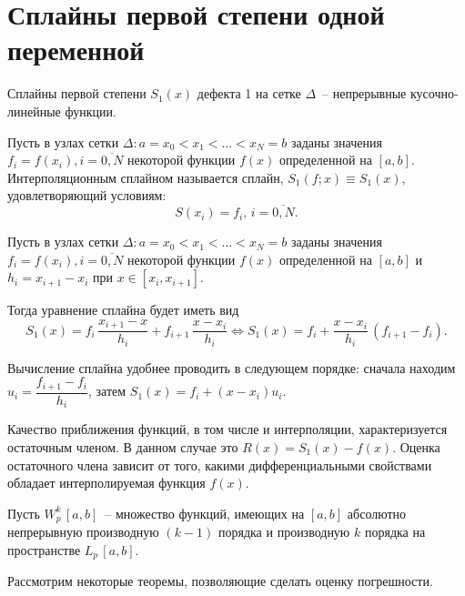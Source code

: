 ﻿\documentclass[a4paper,14pt]{extreport}
\begin{document}
\chapter{Сплайны первой степени одной переменной}
    Сплайны первой степени $S_1(x)$ дефекта 1 на сетке $\Delta$~-- непрерывные кусочно-линейные функции. 
    \begin{definition}
        Пусть в узлах сетки $\Delta:a=x_0<x_1<\ldots<x_N=b$ заданы значения $f_i=f(x_i), i=\overline{0, N}$ некоторой функции $f(x)$ определенной на $[a,b]$. Интерполяционным сплайном называется сплайн,  $S_{1}(f;x)\equiv S_{1}(x)$, удовлетворяющий условиям:
        \begin{equation}
            \label{ch_1.1}
            S(x_i)=f_i,\,i=\overline{0, N}.
        \end{equation}
    \end{definition}
    \begin{definition}
        Пусть в узлах сетки $\Delta:a=x_0<x_1<\ldots<x_N=b$ заданы значения $f_i=f(x_i), i=\overline{0, N}$ некоторой функции $f(x)$ определенной на $[a,b]$ и $h_i=x_{i+1}-x_i$ при  $x\in[x_i,x_{i+1}]$. \par Тогда уравнение сплайна будет иметь вид
        \begin{equation}
            \label{ch_1.2}
            S_1(x) = f_i\,\dfrac{x_{i+1}-x}{h_i}+f_{i+1}\,\dfrac{x-x_{i}}{h_i}\Leftrightarrow S_1(x) = f_i+\dfrac{x-x_{i}}{h_i}\,(f_{i+1}-f_i).
        \end{equation}
    \end{definition}
    Вычисление сплайна удобнее проводить в следующем порядке: сначала находим $u_{i}=\dfrac{f_{i+1}-f_{i}}{h_{i}}$, затем $S_{1}(x)=f_{i}+(x-x_{i}) u_{i}$.
    \par\vspace{3mm} Качество приближения функций, в том числе и интерполяции, характеризуется остаточным членом. В данном случае это $R(x)=S_{1}(x)-f(x)$. Оценка остаточного члена зависит от того, какими дифференциальными свойствами обладает интерполируемая функция $f(x)$. \par Пусть $W_p^k\,[a,b]$~-- множество функций, имеющих на $[a,b]$ абсолютно непрерывную производную $(k-1)$ порядка и производную $k$ порядка на пространстве $L_p\,[a,b]$. \par Рассмотрим некоторые теоремы, позволяющие сделать оценку погрешности.
\end{document}
